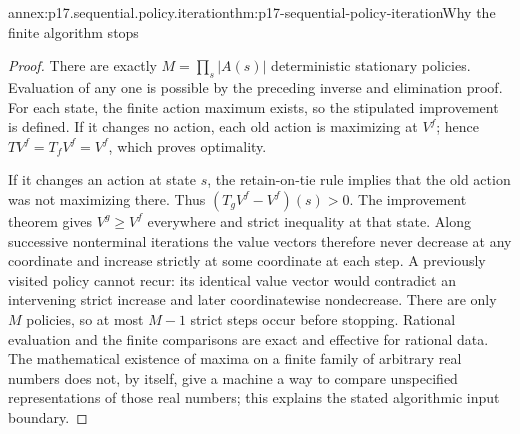 \begin{annexitem}{annex:p17.sequential.policy.iteration}{thm:p17-sequential-policy-iteration}{Why the finite algorithm stops}
\begin{proof}
There are exactly \(M=\prod_s|A(s)|\)
deterministic stationary policies.
Evaluation of any one is possible by the
preceding inverse and elimination proof.
For each state, the finite action maximum
exists, so the stipulated improvement is defined.
If it changes no action, each old action is
maximizing at \(V^f\); hence
\(TV^f=T_fV^f=V^f\), which proves optimality.

If it changes an action at state \(s\), the
retain-on-tie rule implies that the old action
was not maximizing there. Thus
\((T_gV^f-V^f)(s)>0\).
The improvement theorem gives \(V^g\geq V^f\)
everywhere and strict inequality at that state.
Along successive nonterminal iterations the
value vectors therefore never decrease at any
coordinate and increase strictly at some
coordinate at each step. A previously visited
policy cannot recur: its identical value vector
would contradict an intervening strict increase
and later coordinatewise nondecrease.
There are only \(M\) policies, so at most
\(M-1\) strict steps occur before stopping.
Rational evaluation and the finite comparisons
are exact and effective for rational data.
The mathematical existence of maxima on a
finite family of arbitrary real numbers
does not, by itself, give a machine a way
to compare unspecified representations of
those real numbers; this explains the
stated algorithmic input boundary.
\end{proof}
\end{annexitem}

